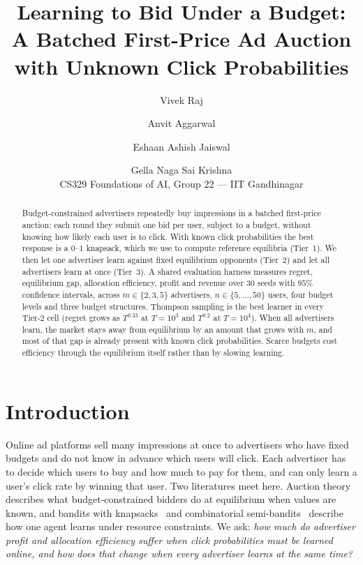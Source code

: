 \documentclass[11pt]{article}
\title{Learning to Bid Under a Budget: A Batched First-Price Ad Auction\\with Unknown Click Probabilities}
\author{Vivek Raj \and Anvit Aggarwal \and Eshaan Ashish Jaiswal \and Gella Naga Sai Krishna\\[0.3em]
\small CS329 Foundations of AI, Group 22 --- IIT Gandhinagar}
\date{}
\begin{document}
\maketitle
\vspace{-1.5em}

\begin{abstract}
Budget-constrained advertisers repeatedly buy impressions in a batched first-price auction: each round
they submit one bid per user, subject to a budget, without knowing how likely each user is to click.
With known click probabilities the best response is a $0$--$1$ knapsack, which we use to compute
reference equilibria (Tier~1). We then let one advertiser learn against fixed equilibrium opponents
(Tier~2) and let all advertisers learn at once (Tier~3). A shared evaluation harness measures regret,
equilibrium gap, allocation efficiency, profit and revenue over $30$ seeds with $95\%$ confidence
intervals, across $m\in\{2,3,5\}$ advertisers, $n\in\{5,\dots,50\}$ users, four budget levels and three
budget structures. Thompson sampling is the best learner in every Tier-2 cell (regret grows as
$T^{0.33}$ at $T=10^3$ and $T^{0.2}$ at $T=10^4$). When all advertisers learn, the market stays away
from equilibrium by an amount that grows with $m$, and most of that gap is already present with known
click probabilities. Scarce budgets cost efficiency through the equilibrium itself rather than by slowing learning.
\end{abstract}

\section{Introduction}
Online ad platforms sell many impressions at once to advertisers who have fixed budgets and do not
know in advance which users will click. Each advertiser has to decide which users to buy and how much
to pay for them, and can only learn a user's click rate by winning that user. Two literatures meet
here. Auction theory describes what budget-constrained bidders do at equilibrium when values are known,
and bandits with knapsacks~\citep{badanidiyuru2013bandits} and combinatorial
semi-bandits~\citep{chen2013combinatorial} describe how one agent learns under resource constraints.
We ask: \emph{how much do advertiser profit and allocation efficiency suffer when click probabilities
must be learned online, and how does that change when every advertiser learns at the same time?}
\end{document}
